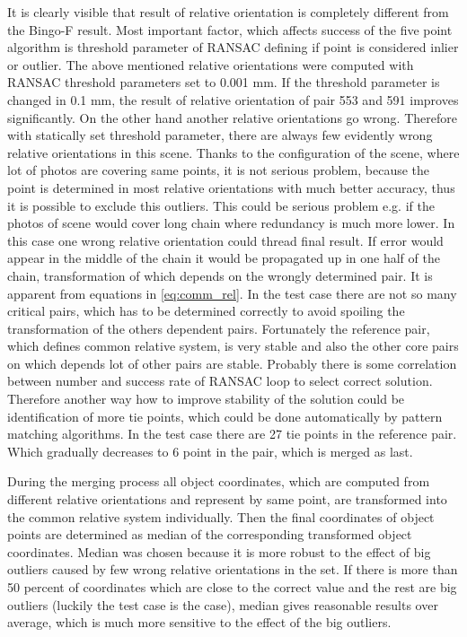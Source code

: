 \documentclass[a4paper,12pt]{article}
\begin{document}
It is clearly visible that result of relative orientation is completely different from the Bingo-F result.
Most important factor, which affects success of the five point algorithm is threshold parameter of RANSAC defining 
if point is considered inlier or outlier.
The above mentioned relative orientations were computed with RANSAC threshold parameters set to 0.001 mm.
If the threshold parameter is changed in 0.1 mm, the result of relative orientation of pair 553 and 591 improves significantly.
On the other hand another relative orientations go wrong. Therefore with statically set threshold parameter, there are always 
few evidently wrong relative orientations in this scene. Thanks to the configuration of the scene, where lot of photos are 
covering same points, it is  not serious problem, because the point is determined in most relative orientations  with 
much better accuracy, thus it is possible to exclude this outliers. This could be serious problem e.g. if the photos 
of scene would cover long chain where redundancy is much more lower.   
In this case one wrong relative orientation could thread final result. If error would appear in the middle 
of the chain it would  be propagated up in one half of the chain, transformation of which depends on the wrongly
determined pair. It is apparent from equations in \eqref{eq:comm_rel}. 
In the test case there are not so many critical pairs, which has to be determined correctly to avoid spoiling the transformation 
of the others dependent pairs. Fortunately the reference pair, which defines common relative system, is very stable and also 
the other  core pairs on which depends lot of other pairs are stable. 
Probably there is some correlation between number 
and success rate of RANSAC loop to select correct solution. 
Therefore another way how to improve stability of the solution 
could be identification of more tie points, which could be done automatically by pattern matching algorithms. 
In the test case there 
are 27 tie points in the reference pair. Which gradually decreases to 6 point in the pair, which is merged as last.

During the merging process all object coordinates, which are computed from different relative orientations and represent  by same point, are 
transformed into  the common relative system individually. Then the final coordinates of object points are determined as median
of the corresponding transformed object coordinates. Median was chosen because it is more robust to the effect of 
big outliers caused by few wrong relative orientations in the set. If there is more than 50 percent of coordinates 
which are close to the correct value and the rest are big outliers (luckily the test case is the case), median gives reasonable results over average,
which is much more sensitive to the effect of the big outliers. 
\end{document}
